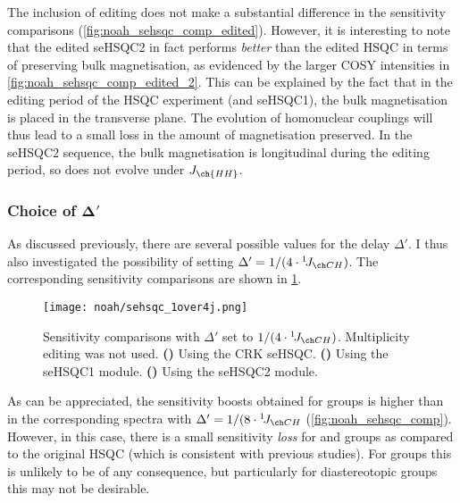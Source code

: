 The inclusion of editing does not make a substantial difference in the sensitivity comparisons (\cref{fig:noah_sehsqc_comp_edited}).
However, it is interesting to note that the edited seHSQC2 in fact performs \textit{better} than the edited HSQC in terms of preserving bulk magnetisation, as evidenced by the larger COSY intensities in \cref{fig:noah_sehsqc_comp_edited_2}.
This can be explained by the fact that in the editing period of the HSQC experiment (and seHSQC1), the bulk magnetisation is placed in the transverse plane.
The evolution of homonuclear couplings will thus lead to a small loss in the amount of  magnetisation preserved.
In the seHSQC2 sequence, the bulk magnetisation is longitudinal during the editing period, so does not evolve under $J_{\ch{HH}}$.


\subsubsection{Choice of $\symbf{\Delta'}$}

As discussed previously, there are several possible values for the delay $\Delta'$.
I thus also investigated the possibility of setting $\Delta' = 1 / (4 \cdot \oneJ{CH})$.
The corresponding sensitivity comparisons are shown in \cref{fig:noah_sehsqc_1over4j}.

\begin{figure}[!ht]
    \centering
    \texttt{[image: noah/sehsqc\_1over4j.png]}%
    {\label{fig:noah_sehsqc_1over4j_crk}}%
    {\label{fig:noah_sehsqc_1over4j_1}}%
    {\label{fig:noah_sehsqc_1over4j_2}}%
    \caption[Sensitivity comparisons for seHSQC with $\Delta' = 1 / (4 \cdot \oneJ{CH})$]{
        Sensitivity comparisons with $\Delta'$ set to $1 / (4 \cdot \oneJ{CH})$.
        Multiplicity editing was not used.
        \textbf{()} Using the CRK seHSQC.
        \textbf{()} Using the seHSQC1 module.
        \textbf{()} Using the seHSQC2 module.
    }
    \label{fig:noah_sehsqc_1over4j}
\end{figure}

As can be appreciated, the sensitivity boosts obtained for  groups is higher than in the corresponding spectra with $\Delta' = 1 / (8 \cdot \oneJ{CH}$ (\cref{fig:noah_sehsqc_comp}).
However, in this case, there is a small sensitivity \textit{loss} for  and  groups as compared to the original HSQC (which is consistent with previous studies\autocite{Schleucher1994JBNMR}).
For  groups this is unlikely to be of any consequence, but particularly for diastereotopic  groups this may not be desirable.

